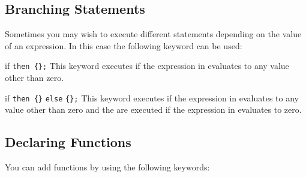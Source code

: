 \subsection{Branching Statements}

Sometimes you may wish to execute different statements depending on the value
of an expression. In this case the following keyword can be used:

\begin{math-keyword}{{if}  \texttt{then \{}\texttt{\};}}
    This keyword executes  if the expression in
     evaluates to any value other than zero.
\end{math-keyword}

\begin{math-keyword}{{if}  \texttt{then \{}\texttt{\}} \texttt{else} \texttt{\{}\texttt{\}}\texttt{;}}
    This keyword executes  if the expression in
     evaluates to any value other than zero and the
     are executed if the expression in
     evaluates to zero.
\begin{codeexample}[preamble={\usetikzlibrary{math}}]
\end{codeexample}
\end{math-keyword}


\subsection{Declaring Functions}

You can add functions by using the following keywords:

